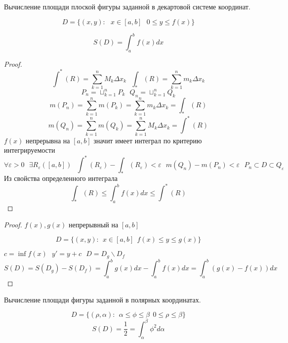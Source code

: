 \begin{title}[\Large]
  Вычисление площади плоской фигуры заданной в декартовой системе координат.
\end{title}

\begin{defin}
 $$
  D = \{ (x,y): ~~~ x \in [a,b]  ~~~ 0 \le y \le f(x) \}
 $$
\end{defin}

\begin{theorem}
  $$
  S(D) = \int_a^b f(x) dx
  $$
\end{theorem}

\begin{proof}
  $$
  \int^* (R) = \sum_{k=1}^n M_k \Delta x_k ~~~
  \int_* (R) = \sum_{k=1}^n m_k \Delta x_k
  $$
  $$
  P_n = \sqcup_{k=1}^n P_k ~~~
  Q_n = \sqcup_{k=1}^n Q_k
  $$
  $$
  m(P_n) = \sum_{k=1}^n m(P_k) = \sum_{k=1}^n m_k \Delta x_k = \int_* (R)
  $$
  $$
  m(Q_n) = \sum_{k=1}^n m(Q_k) = \sum_{k=1}^n M_k \Delta x_k = \int^* (R)
  $$
  $f(x)$ непрерывна на $[a,b]$ значит имеет интеграл по критерию интегрируемости
  $$
  \forall \varepsilon > 0 ~~~
  \exists R_{\varepsilon} ([a,b]) ~~~
  \int^*(R_{\varepsilon}) - \int_* (R_{\varepsilon}) < \varepsilon ~~~
  m(Q_n) - m(P_n) < \varepsilon ~~~
  P_n \subset D \subset Q_{\varepsilon}
  $$
  Из свойства определенного интеграла
  $$
  \int_* (R) \le \int_a^b f(x)dx \le \int^* (R)
  $$
\end{proof}

\begin{proof}
  $f(x),g(x)$ непрерывный на $[a,b]$

  $$
  D = \{ (x,y): ~~ x \in [a,b] ~~ f(x) \le y \le g(x) \}
  $$

  $c = \inf f(x) ~~~ y' = y + c ~~~ D = D_g \backslash D_f$
  $$
  S(D) = S(D_g) - S(D_f) = \int_a^b g(x)dx - \int_a^b f(x)dx =
  \int_a^b (g(x) - f(x)) dx
  $$
\end{proof}

\begin{title}[\Large]
  Вычисление площади фигуры заданной в полярных координатах.
\end{title}

\begin{theorem}
  $$
  D = \{ (\rho,\alpha): ~~ \alpha \le \phi \le \beta ~~ 0 \le
  \rho \le \beta \}
  $$
  $$
  S(D) = \frac{1}{2} = \int_{\alpha}^{\beta} \phi^2 d\alpha
  $$
\end{theorem}

